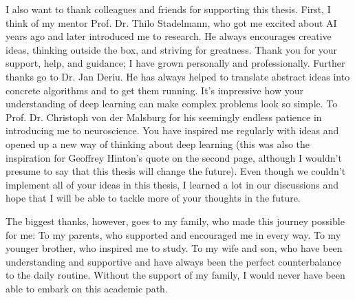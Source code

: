 I also want to thank colleagues and friends for supporting this thesis.
First, I think of my mentor Prof. Dr. Thilo Stadelmann, who got me excited about AI years ago and later introduced me to research.
He always encourages creative ideas, thinking outside the box, and striving for greatness.
Thank you for your support, help, and guidance; I have grown personally and professionally.
Further thanks go to Dr. Jan Deriu. 
He has always helped to translate abstract ideas into concrete algorithms and to get them running.
It's impressive how your understanding of deep learning can make complex problems look so simple.
To Prof. Dr. Christoph von der Malsburg for his seemingly endless patience in introducing me to neuroscience.
You have inspired me regularly with ideas and opened up a new way of thinking about deep learning (this was also the inspiration for Geoffrey Hinton's quote on the second page, although I wouldn't presume to say that this thesis will change the future).
Even though we couldn't implement all of your ideas in this thesis, I learned a lot in our discussions and hope that I will be able to tackle more of your thoughts in the future.

The biggest thanks, however, goes to my family, who made this journey possible for me:
To my parents, who supported and encouraged me in every way.
To my younger brother, who inspired me to study.
To my wife and son, who have been understanding and supportive and have always been the perfect counterbalance to the daily routine.
Without the support of my family, I would never have been able to embark on this academic path.
\normalsize


